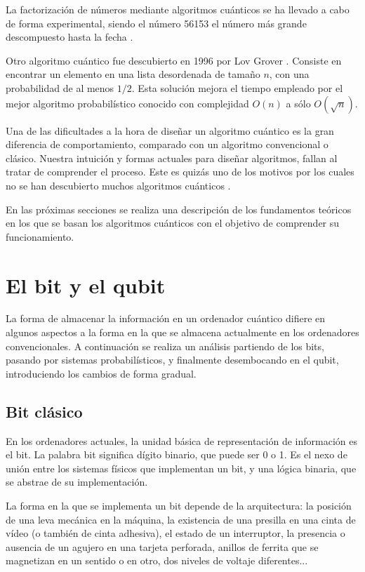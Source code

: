 La factorización de números mediante algoritmos cuánticos se ha llevado a cabo 
de forma experimental, siendo el número 56153 el número más grande descompuesto 
hasta la fecha \cite{factor}. 

Otro algoritmo cuántico fue descubierto en 1996 por Lov Grover \cite{grover96}.  
Consiste en encontrar un elemento en una lista desordenada de tamaño $n$, con 
una probabilidad de al menos $1/2$. Esta solución mejora el tiempo empleado por 
el mejor algoritmo probabilístico conocido con complejidad $O(n)$ a sólo 
$O(\sqrt{n})$.

Una de las dificultades a la hora de diseñar un algoritmo cuántico es la gran 
diferencia de comportamiento, comparado con un algoritmo convencional o clásico.  
Nuestra intuición y formas actuales para diseñar algoritmos, fallan al tratar de 
comprender el proceso. Este es quizás uno de los motivos por los cuales no se 
han descubierto muchos algoritmos cuánticos \cite{shor03}.

En las próximas secciones se realiza una descripción de los fundamentos teóricos 
en los que se basan los algoritmos cuánticos con el objetivo de comprender su 
funcionamiento.

\section{El bit y el qubit}
La forma de almacenar la información en un ordenador cuántico difiere en algunos 
aspectos a la forma en la que se almacena actualmente en los ordenadores 
convencionales. A continuación se realiza un análisis partiendo de los bits, 
pasando por sistemas probabilísticos, y finalmente desembocando en el qubit, 
introduciendo los cambios de forma gradual.

\subsection{Bit clásico}
En los ordenadores actuales, la unidad básica de representación de información 
es el bit. La palabra bit significa dígito binario, que puede ser 0 o 1. Es el 
nexo de unión entre los sistemas físicos que implementan un bit, y una lógica 
binaria, que se abstrae de su implementación.

La forma en la que se implementa un bit depende de la arquitectura: la posición 
de una leva mecánica en la máquina, la existencia de una presilla en una cinta 
de vídeo (o también de cinta adhesiva), el estado de un interruptor, la 
presencia o ausencia de un agujero en una tarjeta perforada, anillos de ferrita 
que se magnetizan en un sentido o en otro, dos niveles de voltaje diferentes...

